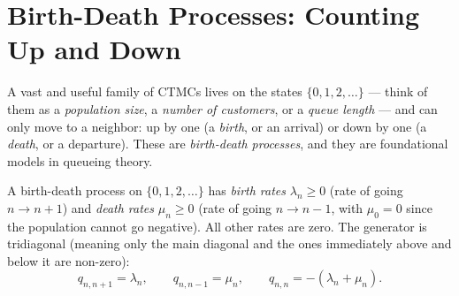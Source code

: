 \section{Birth-Death Processes: Counting Up and Down}
\label{ch27:birthdeath}

A vast and useful family of CTMCs lives on the states $\{0, 1, 2, \dots\}$ --- think of them as a
\emph{population size}, a \emph{number of customers}, or a \emph{queue length} --- and can only move
to a neighbor: up by one (a \emph{birth}, or an arrival) or down by one (a \emph{death}, or a
departure). These are \emph{birth-death processes}, and they are foundational models in queueing theory.

\begin{definition}
\label{ch27:def-bd}
A birth-death process on $\{0,1,2,\dots\}$ has \emph{birth rates} $\lambda_n \ge 0$ (rate of going
$n \to n+1$) and \emph{death rates} $\mu_n \ge 0$ (rate of going $n \to n-1$, with $\mu_0 = 0$ since
the population cannot go negative). All other rates are zero. The generator is tridiagonal (meaning only the main diagonal and the ones immediately above and below it are non-zero):
\[
  q_{n,n+1} = \lambda_n, \qquad q_{n,n-1} = \mu_n,
  \qquad q_{n,n} = -(\lambda_n + \mu_n).
\]
\end{definition}

